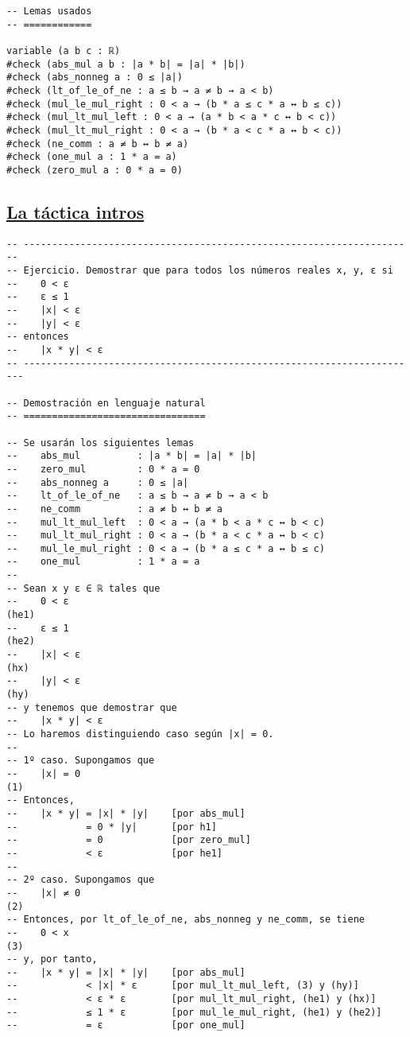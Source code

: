 \begin{verbatim}
-- Lemas usados
-- ============

variable (a b c : ℝ)
#check (abs_mul a b : |a * b| = |a| * |b|)
#check (abs_nonneg a : 0 ≤ |a|)
#check (lt_of_le_of_ne : a ≤ b → a ≠ b → a < b)
#check (mul_le_mul_right : 0 < a → (b * a ≤ c * a ↔ b ≤ c))
#check (mul_lt_mul_left : 0 < a → (a * b < a * c ↔ b < c))
#check (mul_lt_mul_right : 0 < a → (b * a < c * a ↔ b < c))
#check (ne_comm : a ≠ b ↔ b ≠ a)
#check (one_mul a : 1 * a = a)
#check (zero_mul a : 0 * a = 0)
\end{verbatim}

\subsection{\href{./src/Logica/La\_tactica\_intros.lean}{La táctica intros}}
\label{sec:org78c74cb}
\begin{verbatim}
-- ---------------------------------------------------------------------
-- Ejercicio. Demostrar que para todos los números reales x, y, ε si
--    0 < ε
--    ε ≤ 1
--    |x| < ε
--    |y| < ε
-- entonces
--    |x * y| < ε
-- ----------------------------------------------------------------------

-- Demostración en lenguaje natural
-- ================================

-- Se usarán los siguientes lemas
--    abs_mul          : |a * b| = |a| * |b|
--    zero_mul         : 0 * a = 0
--    abs_nonneg a     : 0 ≤ |a|
--    lt_of_le_of_ne   : a ≤ b → a ≠ b → a < b
--    ne_comm          : a ≠ b ↔ b ≠ a
--    mul_lt_mul_left  : 0 < a → (a * b < a * c ↔ b < c)
--    mul_lt_mul_right : 0 < a → (b * a < c * a ↔ b < c)
--    mul_le_mul_right : 0 < a → (b * a ≤ c * a ↔ b ≤ c)
--    one_mul          : 1 * a = a
--
-- Sean x y ε ∈ ℝ tales que
--    0 < ε                                                         (he1)
--    ε ≤ 1                                                         (he2)
--    |x| < ε                                                       (hx)
--    |y| < ε                                                       (hy)
-- y tenemos que demostrar que
--    |x * y| < ε
-- Lo haremos distinguiendo caso según |x| = 0.
--
-- 1º caso. Supongamos que
--    |x| = 0                                                        (1)
-- Entonces,
--    |x * y| = |x| * |y|    [por abs_mul]
--            = 0 * |y|      [por h1]
--            = 0            [por zero_mul]
--            < ε            [por he1]
--
-- 2º caso. Supongamos que
--    |x| ≠ 0                                                        (2)
-- Entonces, por lt_of_le_of_ne, abs_nonneg y ne_comm, se tiene
--    0 < x                                                          (3)
-- y, por tanto,
--    |x * y| = |x| * |y|    [por abs_mul]
--            < |x| * ε      [por mul_lt_mul_left, (3) y (hy)]
--            < ε * ε        [por mul_lt_mul_right, (he1) y (hx)]
--            ≤ 1 * ε        [por mul_le_mul_right, (he1) y (he2)]
--            = ε            [por one_mul]


\end{verbatim}
